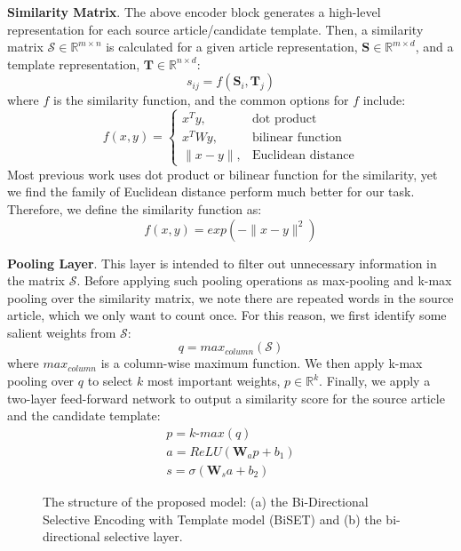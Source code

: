 \documentclass[11pt,a4paper]{article}
\begin{document}
\begin{spacing}{1.0}
\noindent\textbf{Similarity Matrix}. The above encoder block generates a high-level representation for each source article/candidate template. Then, a similarity matrix $\mathcal{S}\in \mathbb{R}^{m\times n}$ is calculated for a given article representation, $\textbf{S}\in \mathbb{R}^{m\times d}$, and a template representation, $\textbf{T}\in \mathbb{R}^{n\times d}$:
\begin{equation}
	s_{ij}=f(\textbf{S}_i,\textbf{T}_j)
\end{equation}
where $f$ is the similarity function, and the common options for $f$ include:
\begin{equation}
f(x,y)=
\begin{cases}
x^Ty,& \text{dot product}\\
x^TWy,& \text{bilinear function}\\
\|x-y\|,& \text{Euclidean distance}
\end{cases}
\end{equation}
Most previous work uses dot product or bilinear function \cite{chen2016thorough} for the similarity, yet we find the family of Euclidean distance perform much better for our task. Therefore, we define the similarity function as:
\begin{equation}
	f(x,y)=exp(-\|x-y\|^2)
\end{equation}

\noindent\textbf{Pooling Layer}. This layer is intended to filter out unnecessary information in the matrix $\mathcal{S}$. Before applying such pooling operations as max-pooling and k-max pooling \cite{kalchbrenner2014convolutional} over the similarity matrix, we note there are repeated words in the source article, which we only want to count once. For this reason, we first identify some salient weights from $\mathcal{S}$:
\begin{equation}
	q=max_{column}(\mathcal{S})
\end{equation}
where $max_{column}$ is a column-wise maximum function. We then apply k-max pooling over $q$ to select $k$ most important weights, $p\in \mathbb{R}^k$. Finally, we apply a two-layer feed-forward network to output a similarity score for the source article and the candidate template:
\begin{gather}
    p=k\textrm{-}max(q)\\
    a=ReLU(\textbf{W}_ap+b_1)\\
	\label{eq:10} s=\sigma(\textbf{W}_sa+b_2)
\end{gather}

\begin{figure*}[t]
\centering
{}
\hspace{0.1in}
\caption{The structure of the proposed model: (a) the Bi-Directional Selective Encoding with Template model (BiSET) and (b) the bi-directional selective layer.}
\label{img:model} \end{figure*}




\end{spacing}
\end{document}
